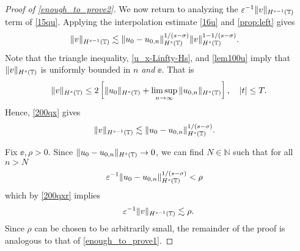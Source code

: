 \begin{proof}[Proof of \eqref{enough_to_prove2}]
We now return to analyzing the $\varepsilon^{-1}
\|v\|_{H^{s-1}(\mathbb{T})}$ term of \eqref{15qu}.
Applying the 
interpolation estimate \eqref{16u} and
\cref{prop:left} gives
%
%
%
%
\begin{equation}
\begin{split}
\label{200qx}
\|v\|_{H^{s-1}(\mathbb{T})} 
& \lesssim  
\|u_0-u_{0,n}\|_{H^s(\mathbb{T})}^{1/(s-\sigma)}\|v\|_{H^s(\mathbb{T})}^{1- 
1/(s-\sigma)}.
\end{split}
\end{equation}
%
%
%
Note that the triangle inequality, \eqref{u_x-Linfty-Hs},
and \eqref{lem100u} 
imply that $\|v\|_{H^s(\mathbb{T})}$ is uniformly bounded in $n$ \emph{and} $\ee$. 
That is
%
%
\begin{equation*}
\begin{split}
	\|v\|_{H^s(\mathbb{T})} \le 2 \left[ \|u_0 \|_{H^s(\mathbb{T})} + \limsup_{n \to 
	\infty} 
	\|u_{0,n}\|_{H^s(\mathbb{T})} 
\right], \quad |t| \le T.
\label{growth_v}
\end{split}
\end{equation*}
%
%
Hence, \eqref{200qx} gives
%
%
\begin{equation}
\begin{split}
\label{200qxr}
\|v\|_{H^{s-1}(\mathbb{T})} 
& \lesssim  
\|u_0-u_{0,n}\|_{H^s(\mathbb{T})}^{1/(s-\sigma)}.
\end{split}
\end{equation}

Fix $\ee, \rho > 0$. Since $\|u_0 -
u_{0,n} \|_{H^s(\mathbb{T})} \to 0$, we
can find $N \in \mathbb{N}$ such that for all $n > N$
%
%
\begin{equation*}
\begin{split}
\varepsilon^{-1} \|u_0-u_{0,n}\|_{H^s(\mathbb{T})}^{1/(s-\sigma)}
& < \rho
\label{uniform_n}
\end{split}
\end{equation*}
%
%
which by \eqref{200qxr} implies
%
%
\begin{equation}
	\label{end-decay}
	\begin{split}
		\varepsilon^{-1} \|v\|_{H^{s-1}(\mathbb{T})} \lesssim \rho.
	\end{split}
\end{equation}
%
%
%
%
Since $\rho$ can be chosen to be arbitrarily small, the remainder of the 
proof is analogous to that of \eqref{enough_to_prove1}. 
\end{proof}
%
%
%
%

